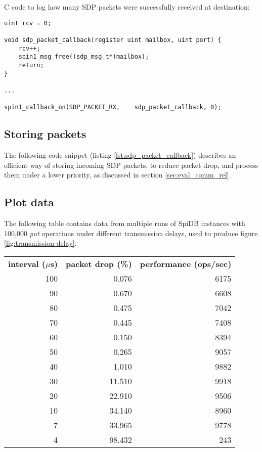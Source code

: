 C code to log how many SDP packets were successfully received at destination:

\begin{lstlisting}[caption={Destination}]
uint rcv = 0;

void sdp_packet_callback(register uint mailbox, uint port) {
    rcv++;
    spin1_msg_free((sdp_msg_t*)mailbox);
    return;
}

...

spin1_callback_on(SDP_PACKET_RX,    sdp_packet_callback, 0);

\end{lstlisting}


\subsection{Storing packets}
The following code snippet (listing \ref{lst:sdp_packet_callback}) describes an efficient way of storing incoming SDP packets, to reduce packet drop, and process them under a lower priority, as discussed in section \ref{sec:eval_comm_rel}.



\clearpage
\newpage

\subsection{Plot data}
The following table contains data from multiple runs of SpiDB instances with 100,000 \textit{put} operations under different transmission delays, used to produce figure \ref{fig:transmission-delay}.

\vspace{5mm}

\begin{tabular}{ r | r | r }
\textbf{interval ($\mu$s)} & \textbf{packet drop (\%)} & \textbf{performance (ops/sec)}  \\
100 & 0.076 	& 6175 \\
90	& 0.670		& 6608 \\
80	& 0.475		& 7042 \\
70	& 0.445		& 7408 \\
60	& 0.150		& 8394 \\
50	& 0.265		& 9057 \\
40	& 1.010		& 9882 \\
30	& 11.510	& 9918 \\
20	& 22.910	& 9506 \\ 
10	& 34.140	& 8960 \\
7	& 33.965 	& 9778 \\
4	& 98.432 	& 243 \\
\end{tabular}

